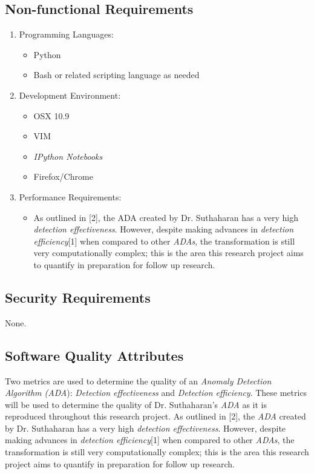 \documentclass[twoside]{article}
\begin{document}
\begin{multicols}{2}
\subsection{Non-functional Requirements}
\begin{enumerate}
	\item Programming Languages:
		\begin{itemize}
        			\item Python
			\item Bash or related scripting language as needed
		\end{itemize}
	\item Development Environment:
		\begin{itemize}
        			\item OSX 10.9
        			\item VIM
        			\item \textit{IPython Notebooks}
        			\item Firefox/Chrome
		\end{itemize}
	\item Performance Requirements:
        		\begin{itemize}
			\item As outlined in [2], the ADA created by Dr. Suthaharan has a very high \textit{detection effectiveness}. However, despite making advances in \textit{detection efficiency}[1] when compared to other \textit{ADAs}, the transformation is still very computationally complex; this is the area this research project aims to quantify in preparation for follow up research.
		\end{itemize}
\end{enumerate}

\subsection{Security Requirements}
None.

\subsection{Software Quality Attributes}
Two metrics are used to determine the quality of an \textit{Anomaly Detection Algorithm (ADA}): \textit{Detection effectiveness} and \textit{Detection efficiency}. These metrics will be used to determine the quality of Dr. Suthaharan's \textit{ADA} as it is reproduced throughout this research project. As outlined in [2], the \textit{ADA} created by Dr. Suthaharan has a very high \textit{detection effectiveness}. However, despite making advances in \textit{detection efficiency}[1] when compared to other \textit{ADAs}, the transformation is still very computationally complex; this is the area this research project aims to quantify in preparation for follow up research.


\end{multicols}
\end{document}
